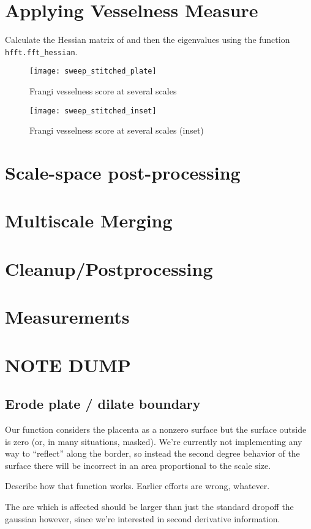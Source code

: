 \section{Applying Vesselness Measure}
Calculate the Hessian matrix of  and then the eigenvalues using the function \texttt{hfft.fft\_hessian}.

\begin{figure}
	\texttt{[image: sweep\_stitched\_plate]}
	\caption{Frangi vesselness score at several scales}
\end{figure}
\begin{figure}
	\texttt{[image: sweep\_stitched\_inset]}
	\caption{Frangi vesselness score at several scales (inset)}
\end{figure}
\section{Scale-space post-processing}
\section{Multiscale Merging}
\section{Cleanup/Postprocessing}
\section{Measurements}

\section{NOTE DUMP}
	
	\subsection{Erode plate / dilate boundary}
	
	Our function considers the placenta as a nonzero surface but the surface outside is zero (or, in many situations, masked). We're currently not implementing any way to ``reflect'' along the border, so instead the second degree behavior of the surface there will be incorrect in an area proportional to the scale size.
	
	Describe how that function works. Earlier efforts are wrong, whatever.
	
	The are which is affected should be larger than just the standard dropoff the gaussian however, since we're interested
	in second derivative information.
